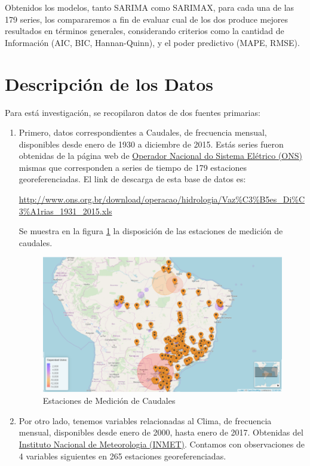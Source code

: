 \documentclass[12pt,oneside]{book}\usepackage[]{graphicx}\usepackage[]{color}
\theoremstyle{definition} %
\begin{document}
Obtenidos los modelos, tanto SARIMA como SARIMAX, para cada una de las 179 series, los compararemos a fin de evaluar cual de los dos produce mejores resultados en términos generales, considerando criterios como la cantidad de Información (AIC, BIC, Hannan-Quinn), y el poder predictivo (MAPE, RMSE).


\section{Descripción de los Datos}

Para está investigación, se recopilaron datos de dos fuentes primarias:

\begin{enumerate}

\item Primero, datos correspondientes a Caudales, de frecuencia mensual, disponibles desde enero de 1930 a diciembre de 2015. Estás series fueron obtenidas de la página web de \href{http://www.ons.org.br/}{Operador Nacional do Sistema Elétrico (ONS)} mismas que corresponden a series de tiempo de 179 estaciones georeferenciadas. El link de descarga de esta base de datos es:

\url{http://www.ons.org.br/download/operacao/hidrologia/Vaz%C3%B5es_Di%C3%A1rias_1931_2015.xls}

Se muestra en la figura \ref{fig:mapa_vaz} la disposición de las estaciones de medición de caudales.


\begin{figure}[H]
	\centering
	\includegraphics[scale=0.5]{map_estacVz}
	\caption{Estaciones de Medición de Caudales}\label{fig:mapa_vaz}
\end{figure}



\item Por otro lado, tenemos variables relacionadas al Clima, de frecuencia mensual, disponibles desde enero de 2000, hasta enero de 2017. Obtenidas del \href{http://www.inmet.gov.br/portal/}{Instituto Nacional de Meteorologia (INMET)}. Contamos con observaciones de 4 variables siguientes en 265 estaciones georeferenciadas.


\end{enumerate}
\end{document}

